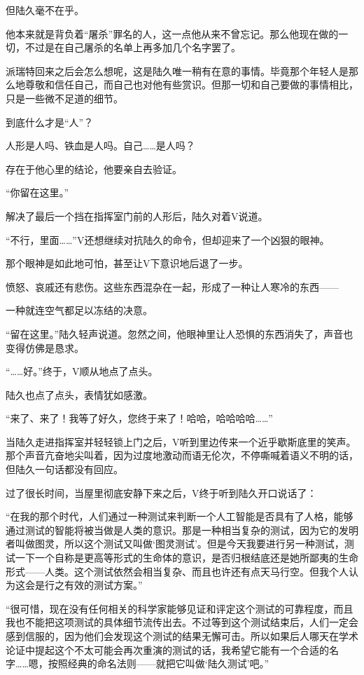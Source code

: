 但陆久毫不在乎。

他本来就是背负着“屠杀”罪名的人，这一点他从来不曾忘记。那么他现在做的一切，不过是在自己屠杀的名单上再多加几个名字罢了。

派瑞特回来之后会怎么想呢，这是陆久唯一稍有在意的事情。毕竟那个年轻人是那么地尊敬和信任自己，而自己也对他有些赏识。但那一切和自己要做的事情相比，只是一些微不足道的细节。

到底什么才是“人”？

人形是人吗、铁血是人吗。自己……是人吗？

存在于他心里的结论，他要亲自去验证。

“你留在这里。”

解决了最后一个挡在指挥室门前的人形后，陆久对着V说道。

“不行，里面……”V还想继续对抗陆久的命令，但却迎来了一个凶狠的眼神。

那个眼神是如此地可怕，甚至让V下意识地后退了一步。

愤怒、哀戚还有悲伤。这些东西混杂在一起，形成了一种让人寒冷的东西——

一种就连空气都足以冻结的决意。

“留在这里。”陆久轻声说道。忽然之间，他眼神里让人恐惧的东西消失了，声音也变得仿佛是恳求。

“……好。”终于，V顺从地点了点头。

陆久也点了点头，表情犹如感激。

“来了、来了！我等了好久，您终于来了！哈哈，哈哈哈哈……”

当陆久走进指挥室并轻轻锁上门之后，V听到里边传来一个近乎歇斯底里的笑声。那个声音亢奋地尖叫着，因为过度地激动而语无伦次，不停嘶喊着语义不明的话，但陆久一句话都没有回应。

过了很长时间，当屋里彻底安静下来之后，V终于听到陆久开口说话了：

“在我的那个时代，人们通过一种测试来判断一个人工智能是否具有了人格，能够通过测试的智能将被当做是人类的意识。那是一种相当复杂的测试，因为它的发明者叫做图灵，所以这个测试又叫做‘图灵测试’。但是今天我要进行另一种测试，测试一下一个自称是更高等形式的生命体的意识，是否归根结底还是她所鄙夷的生命形式——人类。这个测试依然会相当复杂、而且也许还有点天马行空。但我个人认为这会是行之有效的测试方案。”

“很可惜，现在没有任何相关的科学家能够见证和评定这个测试的可靠程度，而且我也不能把这项测试的具体细节流传出去。不过等到这个测试结束后，人们一定会感到信服的，因为他们会发现这个测试的结果无懈可击。所以如果后人哪天在学术论证中提起这个不太可能会再次重演的测试的话，我希望它能有一个合适的名字……嗯，按照经典的命名法则——就把它叫做‘陆久测试’吧。”


